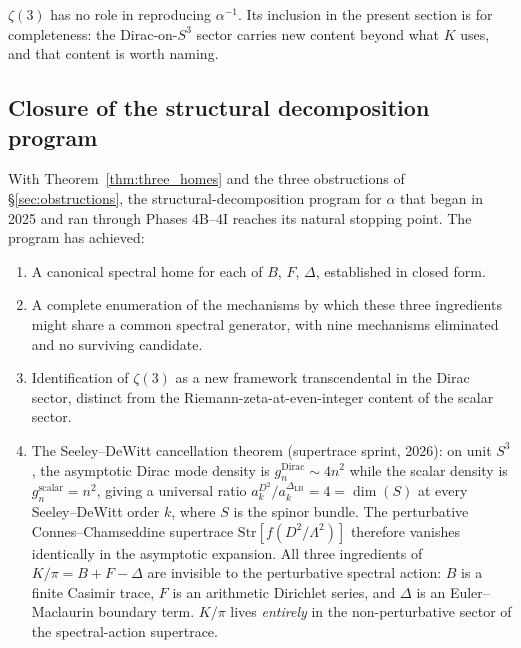 \documentclass[aps,prl,twocolumn,superscriptaddress]{revtex4-2}
\begin{document}
$\zeta(3)$ has no role in reproducing $\alpha^{-1}$. Its inclusion in
the present section is for completeness: the Dirac-on-$S^{3}$ sector
carries new content beyond what $K$ uses, and that content is worth
naming.

\subsection{Closure of the structural decomposition program}\label{sec:closure}

With Theorem~\ref{thm:three_homes} and the three obstructions of
\S\ref{sec:obstructions}, the structural-decomposition program for
$\alpha$ that began in 2025 and ran through Phases 4B--4I reaches its
natural stopping point. The program has achieved:

\begin{enumerate}
  \item A canonical spectral home for each of $B$, $F$, $\Delta$,
    established in closed form.
  \item A complete enumeration of the mechanisms by which these three
    ingredients might share a common spectral generator, with nine
    mechanisms eliminated and no surviving candidate.
  \item Identification of $\zeta(3)$ as a new framework transcendental
    in the Dirac sector, distinct from the Riemann-zeta-at-even-integer
    content of the scalar sector.
  \item The Seeley--DeWitt cancellation theorem (supertrace sprint,
    2026): on unit $S^{3}$, the asymptotic Dirac mode density is
    $g_{n}^{\mathrm{Dirac}} \sim 4n^{2}$ while the scalar density is
    $g_{n}^{\mathrm{scalar}} = n^{2}$, giving a universal ratio
    $a_{k}^{D^{2}} / a_{k}^{\Delta_{\mathrm{LB}}} = 4 = \dim(S)$
    at every Seeley--DeWitt order $k$, where $S$ is the spinor bundle.
    The perturbative Connes--Chamseddine supertrace
    $\mathrm{Str}[f(D^{2}/\Lambda^{2})]$ therefore vanishes identically
    in the asymptotic expansion.  All three ingredients of
    $K/\pi = B + F - \Delta$ are invisible to the perturbative spectral
    action: $B$ is a finite Casimir trace, $F$ is an arithmetic
    Dirichlet series, and $\Delta$ is an Euler--Maclaurin boundary term.
    $K/\pi$ lives \emph{entirely} in the non-perturbative sector of the
    spectral-action supertrace.
\end{enumerate}
\end{document}

